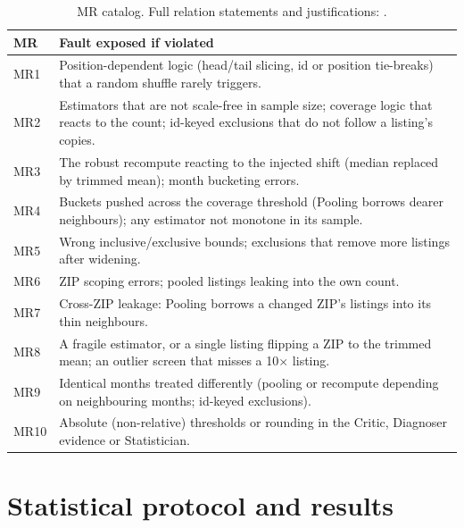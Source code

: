 \documentclass[11pt,a4paper]{article}
\newcommand{\file}[1]{\texttt{\detokenize{#1}}}
\begin{document}
\begin{table}[p]
\vspace{4pt}
\begin{tabularx}{\textwidth}{@{}L{0.6cm}X@{}}
\toprule
MR & Fault exposed if violated \\
\midrule
MR1 & Position-dependent logic (head/tail slicing, id or position tie-breaks) that a random shuffle rarely triggers. \\
MR2 & Estimators that are not scale-free in sample size; coverage logic that reacts to the count; id-keyed exclusions that do not follow a listing's copies. \\
MR3 & The robust recompute reacting to the injected shift (median replaced by trimmed mean); month bucketing errors. \\
MR4 & Buckets pushed across the coverage threshold (Pooling borrows dearer neighbours); any estimator not monotone in its sample. \\
MR5 & Wrong inclusive/exclusive bounds; exclusions that remove more listings after widening. \\
MR6 & ZIP scoping errors; pooled listings leaking into the own count. \\
MR7 & Cross-ZIP leakage: Pooling borrows a changed ZIP's listings into its thin neighbours. \\
MR8 & A fragile estimator, or a single listing flipping a ZIP to the trimmed mean; an outlier screen that misses a 10$\times$ listing. \\
MR9 & Identical months treated differently (pooling or recompute depending on neighbouring months; id-keyed exclusions). \\
MR10 & Absolute (non-relative) thresholds or rounding in the Critic, Diagnoser evidence or Statistician. \\
\bottomrule
\end{tabularx}
\caption{MR catalog. Full relation statements and justifications: \file{docs/mr_catalog.md}.}
\label{tab:catalog}
\end{table}

\section{Statistical protocol and results}\label{sec:results}
\end{document}
